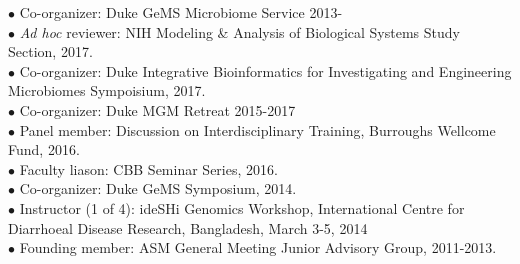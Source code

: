 \documentclass[overlapped,line,11pt]{res}
\begin{document}
\begin{resume}
\vspace{-10mm}
\hangindent=0.5in $\bullet$\hspace{.1in} Co-organizer: Duke GeMS
Microbiome Service 2013- \\

\vspace{-10mm} \hangindent=0.5in $\bullet$\hspace{.1in} \emph{Ad hoc} reviewer:
NIH Modeling \& Analysis of Biological Systems Study Section, 2017. \\

\vspace{-10mm} \hangindent=0.5in $\bullet$\hspace{.1in} Co-organizer:
Duke Integrative Bioinformatics for Investigating and Engineering
Microbiomes Sympoisium, 2017. \\

\vspace{-10mm}
\hangindent=0.5in $\bullet$\hspace{.1in} Co-organizer: 
 Duke MGM Retreat 2015-2017 \\

\vspace{-10mm} \hangindent=0.5in $\bullet$\hspace{.1in} Panel member:
Discussion on Interdisciplinary Training, Burroughs Wellcome Fund, 2016. \\

\vspace{-10mm}
\hangindent=0.5in $\bullet$\hspace{.1in} Faculty liason: CBB Seminar Series, 2016. \\

\vspace{-10mm}
\hangindent=0.5in $\bullet$\hspace{.1in} Co-organizer: Duke GeMS
Symposium, 2014. \\

\vspace{-10mm}
\hangindent=0.5in $\bullet$\hspace{.1in} Instructor (1 of 4): ideSHi
Genomics Workshop, International Centre for Diarrhoeal
Disease Research, Bangladesh, March 3-5, 2014 \\

\vspace{-10mm}
\hangindent=0.5in $\bullet$\hspace{.1in} Founding member: ASM General Meeting
Junior Advisory Group, 2011-2013. 




\end{resume}
\end{document}
